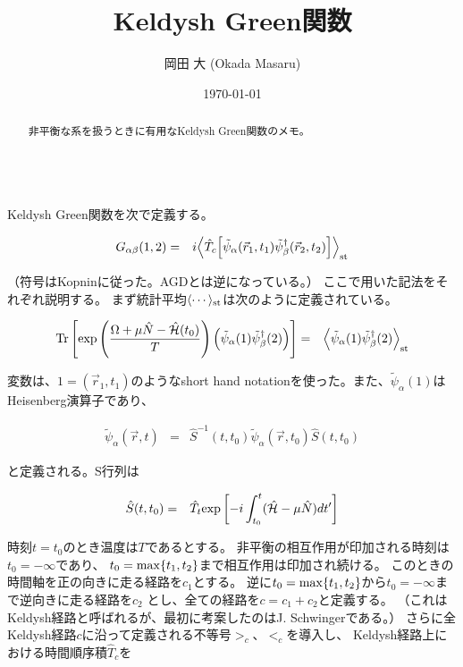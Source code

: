 \documentclass[uplatex,a4j,12pt,dvipdfmx]{jsarticle}
\title{
Keldysh Green関数
}
\author{岡田 大 (Okada Masaru)}
\date{\today}
\begin{document}
\maketitle

\begin{abstract}
	非平衡な系を扱うときに有用なKeldysh Green関数のメモ。
\end{abstract}

\ \\

Keldysh Green関数を次で定義する。

\begin{eqnarray}
	G_{\alpha \beta}(1,2)
	&=&
	i \Big\langle \hat{T}_{c} \Big[ \tilde{\psi}_{\alpha}(\vec{r}_{1},t_{1}) \tilde{\psi}_{\beta}^{\dagger}(\vec{r}_{2},t_{2}) \Big] \Big\rangle_{\rm st}
\end{eqnarray}

（符号はKopninに従った。AGDとは逆になっている。）
ここで用いた記法をそれぞれ説明する。
まず統計平均$\langle \cdots \rangle_{\rm st}$は次のように定義されている。

\begin{eqnarray}
	{\rm Tr}
	\left[ {\rm exp} \left( \dfrac{\Omega + \mu \hat{N} - \hat{\mathcal{H}}(t_{0}) }{T} \right)
		\Big( \tilde{\psi}_{\alpha}(1) \tilde{\psi}_{\beta}^{\dagger}(2) \Big)
		\right]
	&=&
	\Big\langle \tilde{\psi}_{\alpha}(1) \tilde{\psi}_{\beta}^{\dagger}(2) \Big\rangle_{\rm st}
\end{eqnarray}

変数は、$1=(\vec{r}_{1},t_{1})$のようなshort hand notationを使った。また、$\tilde{\psi}_{\alpha}(1)$はHeisenberg演算子であり、

\begin{eqnarray}
	\tilde{\psi}_{\alpha}(\vec{r},t)
	&=&
	\hat{S}^{-1}(t,t_{0})
	\tilde{\psi}_{\alpha}(\vec{r},t_{0})
	\hat{S}(t,t_{0})
\end{eqnarray}

と定義される。S行列は

\begin{eqnarray}
	\hat{S}(t,t_{0})
	&=&
	\hat{T}_{t}
	{\rm exp} \left[ - i \int^{t}_{t_{0}} ( \hat{\mathcal{H}} - \mu \hat{N} ) dt' \right]
\end{eqnarray}

時刻$t=t_{0}$のとき温度は$T$であるとする。
非平衡の相互作用が印加される時刻は$t_{0} = - \infty$であり、
$t_{0}={\rm max} \{ t_{1},t_{2}\}$まで相互作用は印加され続ける。
このときの時間軸を正の向きに走る経路を$c_{1}$とする。
逆に$t_{0}={\rm max} \{ t_{1},t_{2}\}$から$t_{0} = - \infty$まで逆向きに走る経路を$c_{2}$
とし、全ての経路を$c=c_{1}+c_{2}$と定義する。
（これはKeldysh経路と呼ばれるが、最初に考案したのはJ. Schwingerである。）
さらに全Keldysh経路$c$に沿って定義される不等号$>_{c}$、$<_{c}$を導入し、
Keldysh経路上における時間順序積$\hat{T}_{c}$を
\end{document}
